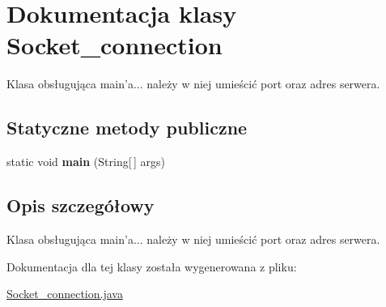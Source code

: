 \hypertarget{classSocket__connection}{\section{Dokumentacja klasy Socket\+\_\+connection}
\label{classSocket__connection}
}


Klasa obsługująca main'a... należy w niej umieścić port oraz adres serwera.  


\subsection*{Statyczne metody publiczne}
\begin{DoxyCompactItemize}
\item 
\hypertarget{classSocket__connection_a5c7d9373553fa2b863b2d6c6021fed60}{static void {\bfseries main} (String\mbox{[}$\,$\mbox{]} args)}\label{classSocket__connection_a5c7d9373553fa2b863b2d6c6021fed60}

\end{DoxyCompactItemize}


\subsection{Opis szczegółowy}
Klasa obsługująca main'a... należy w niej umieścić port oraz adres serwera. 

Dokumentacja dla tej klasy została wygenerowana z pliku\+:\begin{DoxyCompactItemize}
\item 
\hyperlink{Socket__connection_8java}{Socket\+\_\+connection.\+java}\end{DoxyCompactItemize}
